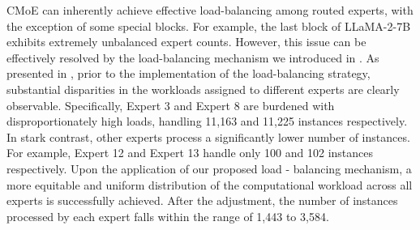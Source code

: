 



CMoE can inherently achieve effective load-balancing among routed experts, with the exception of some special blocks. For example, the last block of LLaMA-2-7B exhibits extremely unbalanced expert counts.
However, this issue can be effectively resolved by the load-balancing mechanism we introduced in . 
As presented in , prior to the implementation of the load-balancing strategy, substantial disparities in the workloads assigned to different experts are clearly observable. Specifically, Expert 3 and Expert 8 are burdened with disproportionately high loads, handling 11,163 and 11,225 instances respectively. In stark contrast, other experts process a significantly lower number of instances. For example, Expert 12 and Expert 13 handle only 100 and 102 instances respectively.
Upon the application of our proposed load - balancing mechanism, a more equitable and uniform distribution of the computational workload across all experts is successfully achieved. After the adjustment, the number of instances processed by each expert falls within the range of 1,443 to 3,584.


